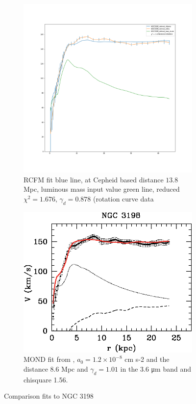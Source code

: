 \documentclass[reprint,%
 amsmath,amssymb,
 aps,
]{revtex4-1}
\begin{document}
 



 
  
  \begin{figure}[h!] 
    \begin{subfigure}[c]{0.5\linewidth}
    \centering
    \includegraphics[width=0.95\linewidth]{figures/NGC3198_rotmod_XueSofue.png}
    \caption{RCFM fit blue line, at Cepheid based distance $13.8$Mpc,   luminous mass input value   green line, reduced $\chi^2  =1.676$, $\gamma_d = 0.878$ (rotation curve data \cite{2016Lelli} }
    \label{fig:NGC3198RCFM} 
  \end{subfigure}%
  \begin{subfigure}[c]{0.5\linewidth}
    \centering
    \includegraphics[width=0.95\linewidth]{figures/NGC3198_TAM_aa15283-10-fig7.eps} 
    \caption{ MOND fit from  \cite{Blok1}, $a_0 = 1.2 \times 10^{-8}$ cm s-2 and the distance $8.6$ Mpc and $\gamma_d =  1.01$ in the 3.6 μm band and chisquare 1.56. } 
    \label{fig:NGC3198MOND} 
  \end{subfigure}%
  \caption{ Comparison fits to  NGC 3198 }
  \label{fig7} 
\end{figure}
\end{document}
